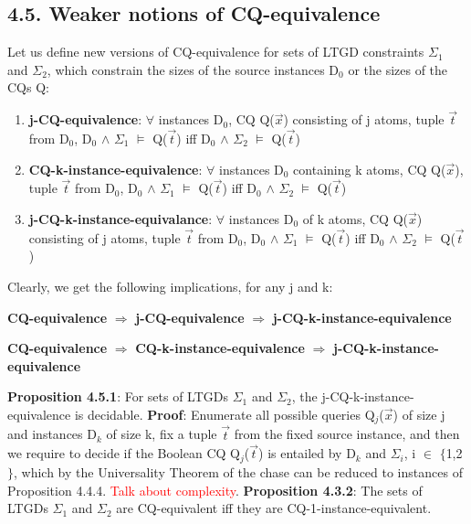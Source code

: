 \documentclass[11pt, a4paper, dvipsnames]{article}
\begin{document}
\subsection{4.5. Weaker notions of CQ-equivalence}
Let us define new versions of CQ-equivalence for sets of LTGD constraints $\Sigma_{1}$ and $\Sigma_{2}$, which constrain the sizes of the source instances D$_{0}$ or the sizes of the CQs Q:
\begin{enumerate}
	\item \textbf{j-CQ-equivalence}: $\forall$ instances D$_{0}$, CQ Q($\vec{x}$) consisting of j atoms, tuple $\vec{t}$ from D$_{0}$, D$_{0}$ $\wedge$ $\Sigma_{1}$ $\vDash$ Q($\vec{t}$) iff D$_{0}$ $\wedge$ $\Sigma_{2}$ $\vDash$ Q($\vec{t}$)
	\item \textbf{CQ-k-instance-equivalence}: $\forall$ instances D$_{0}$ containing k atoms, CQ Q($\vec{x}$), tuple $\vec{t}$ from D$_{0}$, D$_{0}$ $\wedge$ $\Sigma_{1}$ $\vDash$ Q($\vec{t}$) iff D$_{0}$ $\wedge$ $\Sigma_{2}$ $\vDash$ Q($\vec{t}$)
	\item \textbf{j-CQ-k-instance-equivalance}: $\forall$ instances D$_{0}$ of k atoms, CQ Q($\vec{x}$) consisting of j atoms, tuple $\vec{t}$ from D$_{0}$, D$_{0}$ $\wedge$ $\Sigma_{1}$ $\vDash$ Q($\vec{t}$) iff D$_{0}$ $\wedge$ $\Sigma_{2}$ $\vDash$ Q($\vec{t}$)
\end{enumerate}
Clearly, we get the following implications, for any j and k:
\begin{center}
\textbf{CQ-equivalence} $\Rightarrow$ \textbf{j-CQ-equivalence} $\Rightarrow$ \textbf{j-CQ-k-instance-equivalence}
\end{center}
\begin{center}
\textbf{CQ-equivalence} $\Rightarrow$ \textbf{CQ-k-instance-equivalence} $\Rightarrow$ \textbf{j-CQ-k-instance-equivalence}
\end{center}
\textbf{Proposition 4.5.1}: For sets of LTGDs $\Sigma_{1}$ and $\Sigma_{2}$, the j-CQ-k-instance-equivalence is decidable.\newline
\textbf{Proof}: Enumerate all possible queries Q$_{j}$($\vec{x}$) of size j and instances D$_{k}$ of size k, fix a tuple $\vec{t}$ from the fixed source instance, and then we require to decide if the Boolean CQ Q$_{j}$($\vec{t}$) is entailed by D$_{k}$ and $\Sigma_{i}$, i $\in$ $\{$1,2$\}$, which by the Universality Theorem of the chase can be reduced to instances of Proposition 4.4.4. \newline
\textcolor{red}{Talk about complexity}.\newline
\textbf{Proposition 4.3.2}: The sets of LTGDs $\Sigma_{1}$ and $\Sigma_{2}$ are CQ-equivalent iff they are CQ-1-instance-equivalent.\newline
\end{document}
